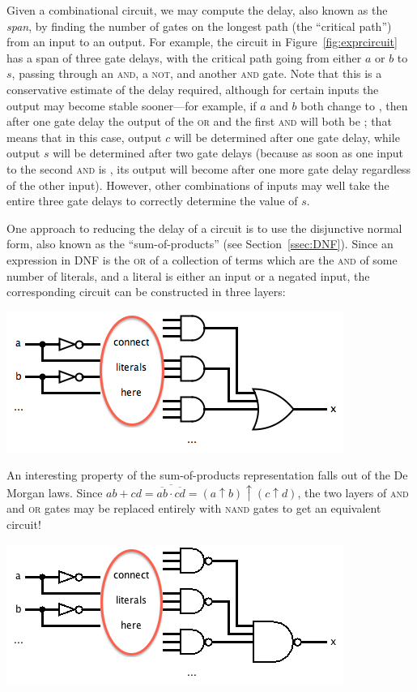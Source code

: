 Given a combinational circuit, we may compute the delay, also known as the \textit{span}, by finding the number of gates on the longest path (the ``critical path'') from an input to an output. For example, the circuit in Figure~\ref{fig:exprcircuit} has a span of three gate delays, with the critical path going from either $a$ or $b$ to $s$, passing through an \textsc{and}, a \textsc{not}, and another \textsc{and} gate. Note that this is a conservative estimate of the delay required, although for certain inputs the output may become stable sooner---for example, if $a$ and $b$ both change to \0, then after one gate delay the output of the \textsc{or} and the first \textsc{and} will both be \0; that means that in this case, output $c$ will be determined after one gate delay, while output $s$ will be determined after two gate delays (because as soon as one input to the second \textsc{and} is \0, its output will become \0 after one more gate delay regardless of the other input). However, other combinations of inputs may well take the entire three gate delays to correctly determine the value of $s$.

One approach to reducing the delay of a circuit is to use the disjunctive normal form, also known as the ``sum-of-products'' (see Section~\ref{ssec:DNF}). Since an expression in DNF is the \textsc{or} of a collection of terms which are the \textsc{and} of some number of literals, and a literal is either an input or a negated input, the corresponding circuit can be constructed in three layers:
\begin{center}
\includegraphics[width=!,height=!,scale=0.75]{graphics/DNFlayers.png}
\end{center}

An interesting property of the sum-of-products representation falls out of the De Morgan laws. Since $ab+cd=\overline{\overline{ab}\cdot\overline{cd}}=(a\uparrow b)\uparrow(c\uparrow d)$, the two layers of \textsc{and} and \textsc{or} gates may be replaced entirely with \textsc{nand} gates to get an equivalent circuit!
\begin{center}
\includegraphics[width=!,height=!,scale=0.75]{graphics/DNFlayersNand.png}
\end{center}

